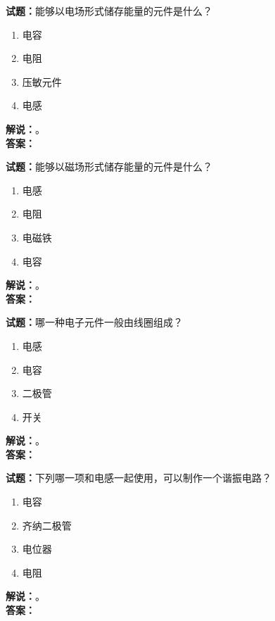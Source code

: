 \documentclass{ctexbook}
\begin{document}
\vspace{\baselineskip}

\noindent\textbf{试题：}能够以电场形式储存能量的元件是什么？
\begin{enumerate}[leftmargin=3em]
  \item 电容
  \item 电阻
  \item 压敏元件
  \item 电感
\end{enumerate}
\noindent\textbf{解说：}\textbf{}。\\\noindent\textbf{答案：}

\vspace{\baselineskip}

\noindent\textbf{试题：}能够以磁场形式储存能量的元件是什么？
\begin{enumerate}[leftmargin=3em]
  \item 电感
  \item 电阻
  \item 电磁铁
  \item 电容
\end{enumerate}
\noindent\textbf{解说：}\textbf{}。\\\noindent\textbf{答案：}

\vspace{\baselineskip}

\noindent\textbf{试题：}哪一种电子元件一般由线圈组成？
\begin{enumerate}[leftmargin=3em]
  \item 电感
  \item 电容
  \item 二极管
  \item 开关
\end{enumerate}
\noindent\textbf{解说：}\textbf{}。\\\noindent\textbf{答案：}

\vspace{\baselineskip}

\noindent\textbf{试题：}下列哪一项和电感一起使用，可以制作一个谐振电路？
\begin{enumerate}[leftmargin=3em]
  \item 电容
  \item 齐纳二极管
  \item 电位器
  \item 电阻
\end{enumerate}
\noindent\textbf{解说：}\textbf{}。\\\noindent\textbf{答案：}
\end{document}
